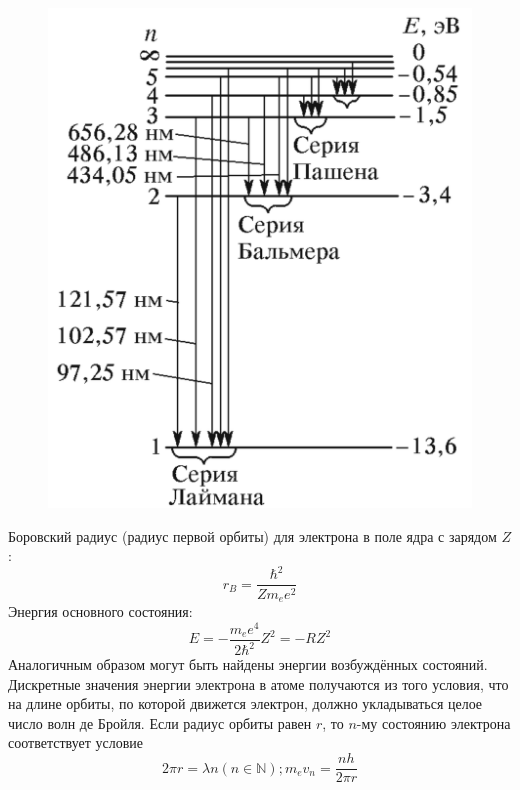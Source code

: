 \documentclass[a4paper]{article}
\begin{document}
\begin{figure}[H]
    \begin{center}
    \includegraphics[scale = 0.3]{p1.png}
    \caption{}
    \label{p1}
    \end{center}
\end{figure}

Боровский радиус (радиус первой орбиты) для электрона в поле ядра с зарядом $Z$:
\begin{equation}
    r_B = \frac{\hbar^2}{Z m_e e^2}
\end{equation}
Энергия основного состояния:
\begin{equation}
    E = -\frac{m_e e^4}{2 \hbar^2}Z^2 = -R Z^2
\end{equation}
Аналогичным образом могут быть найдены энергии возбуждённых состояний. Дискретные значения 
энергии электрона в атоме получаются из того условия, что на длине орбиты, по которой движется 
электрон, должно укладываться целое число волн де Бройля. Если радиус орбиты равен $r$, то $n$-му 
состоянию электрона соответствует условие 
\begin{equation}
    2 \pi r = \lambda n (n \in \mathbb{N}) ; m_e v_n = \frac{nh}{2 \pi r}
\end{equation}
\end{document}
